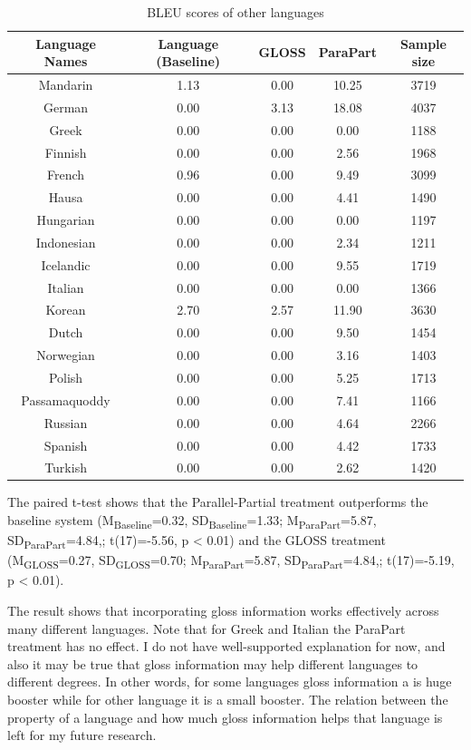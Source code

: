 \documentclass[final]{ua-thesis}
\numberwithin{equation}{section}
\begin{document}
\begin{table}[ht]
\centering
\begin{tabular}{ccccc}
  \hline
Language Names & Language (Baseline) & GLOSS & ParaPart & Sample size \\ 
  \hline
Mandarin & 1.13 & 0.00 & 10.25 & 3719 \\ 
  German & 0.00 & 3.13 & 18.08 & 4037 \\ 
  Greek & 0.00 & 0.00 & 0.00 & 1188 \\ 
  Finnish & 0.00 & 0.00 & 2.56 & 1968 \\ 
  French & 0.96 & 0.00 & 9.49 & 3099 \\ 
  Hausa & 0.00 & 0.00 & 4.41 & 1490 \\ 
  Hungarian & 0.00 & 0.00 & 0.00 & 1197 \\ 
  Indonesian & 0.00 & 0.00 & 2.34 & 1211 \\ 
  Icelandic & 0.00 & 0.00 & 9.55 & 1719 \\ 
  Italian & 0.00 & 0.00 & 0.00 & 1366 \\ 
  Korean & 2.70 & 2.57 & 11.90 & 3630 \\ 
  Dutch & 0.00 & 0.00 & 9.50 & 1454 \\ 
  Norwegian & 0.00 & 0.00 & 3.16 & 1403 \\ 
  Polish & 0.00 & 0.00 & 5.25 & 1713 \\ 
  Passamaquoddy & 0.00 & 0.00 & 7.41 & 1166 \\ 
  Russian & 0.00 & 0.00 & 4.64 & 2266 \\ 
  Spanish & 0.00 & 0.00 & 4.42 & 1733 \\ 
  Turkish & 0.00 & 0.00 & 2.62 & 1420 \\ 
   \hline
\end{tabular}
\caption{BLEU scores of other languages} 
\label{Table:Other_LG_BLEU}
\end{table}
The paired t-test shows that the Parallel-Partial treatment outperforms the baseline system 
(M\textsubscript{Baseline}=0.32, SD\textsubscript{Baseline}=1.33; M\textsubscript{ParaPart}=5.87, SD\textsubscript{ParaPart}=4.84,; t(17)=-5.56, p < 0.01) and the GLOSS treatment 
(M\textsubscript{GLOSS}=0.27, SD\textsubscript{GLOSS}=0.70; M\textsubscript{ParaPart}=5.87, SD\textsubscript{ParaPart}=4.84,; t(17)=-5.19, p < 0.01).


The result shows that incorporating gloss information works effectively across many different languages. Note that for Greek and Italian the ParaPart treatment has no effect. I do not have well-supported explanation for now, and also it may be true that gloss information may help different languages to different degrees. In other words, for some languages gloss information a is huge booster while for other language it is a small booster. The relation between the property of a language and how much gloss information helps that language is left for my future research.     
\end{document}
